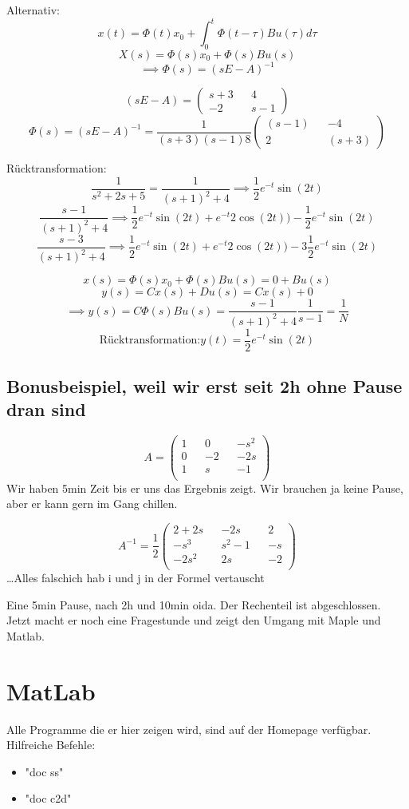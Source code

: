 \documentclass[a4paper]{article}
\begin{document}
Alternativ:
\[ x(t)=\Phi(t)x_{0}+\int_{0}^{t} \Phi(t-\tau)Bu(\tau)d\tau  \]
\[ X(s)=\Phi(s)x_{0}+\Phi(s)Bu(s) \]
\[\implies \Phi(s)=(sE-A)^{-1} \]


\[ (sE-A)=\begin{pmatrix}
s+3 && 4\\
-2 && s-1
\end{pmatrix}  \]
\[ \Phi(s)=(sE-A)^{-1}=\frac{1}{(s+3)(s-1)8}\begin{pmatrix}
    (s-1) && -4\\
2 && (s+3)
\end{pmatrix}  \]

Rücktransformation:
\[ \frac{1}{s^{2}+2s+5}=\frac{1}{(s+1)^{2}+4}\implies \frac{1}{2}e^{-t}\sin(2t)  \]
\[ \frac{s-1}{(s+1)^{2}+4}\implies \frac{1}{2}e^{-t}\sin(2t)+e^{-t}2\cos(2t))-\frac{1}{2}e^{-t}\sin(2t) \]
\[ \frac{s-3}{(s+1)^{2}+4}\implies \frac{1}{2}e^{-t}\sin(2t)+e^{-t}2\cos(2t))-3\frac{1}{2}e^{-t}\sin(2t)  \]

\[ x(s)=\Phi(s)x_{0}+\Phi(s)Bu(s)=0+Bu(s) \]
\[ y(s)=Cx(s)+Du(s)=Cx(s)+0 \]
\[ \implies y(s)=C\Phi(s)Bu(s)=\frac{s-1}{(s+1)^{2}+4}\frac{1}{s-1}=\frac{1}{N} \]
\[ \text{Rücktransformation:} y(t)=\frac{1}{2}e^{-t}\sin(2t) \]

\subsection*{Bonusbeispiel, weil wir erst seit 2h ohne Pause dran sind}
\[ A=\begin{pmatrix}
1 && 0 && -s^{2}\\
0 && -2 && -2s\\
1 && s && -1\\
\end{pmatrix}  \]
Wir haben 5min Zeit bis er uns das Ergebnis zeigt. Wir brauchen ja keine Pause, aber er kann gern im Gang chillen.

\[ A^{-1}= \frac{1}{2} \begin{pmatrix}
2+2s && -2s && 2\\
-s^{3} && s^{2}-1 && -s\\
-2s^{2} && 2s && -2\\
\end{pmatrix}\]
\ldots Alles falsch\ldot ich hab i und j in der Formel vertauscht

Eine 5min Pause, nach 2h und 10min oida. Der Rechenteil ist abgeschlossen. Jetzt macht er noch eine Fragestunde und zeigt den Umgang mit Maple und Matlab.

\section*{MatLab}
Alle Programme die er hier zeigen wird, sind auf der Homepage verfügbar.
Hilfreiche Befehle:
\begin{itemize}
    \item "doc ss"
    \item "doc c2d"
\end{itemize}
\end{document}

